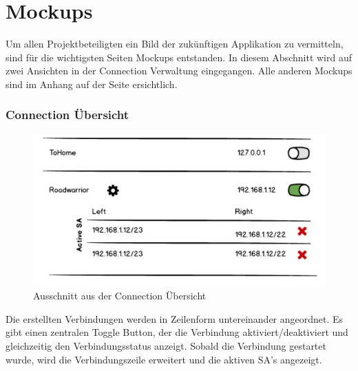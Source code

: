\section{Mockups}
Um allen Projektbeteiligten ein Bild der zukünftigen Applikation zu vermitteln, sind für die wichtigsten Seiten Mockups entstanden. In diesem Abschnitt wird auf zwei Ansichten in der Connection Verwaltung eingegangen. Alle anderen Mockups sind im Anhang auf der Seite \pageref{Mockups} ersichtlich.

\subsubsection{Connection Übersicht}
\begin{figure}[H]
	\centering
	\includegraphics[width=330pt]{images/mockups/short_con_overview.jpg}
	\caption{Ausschnitt aus der Connection Übersicht}
\end{figure}

Die erstellten Verbindungen werden in Zeilenform untereinander angeordnet. Es gibt einen zentralen Toggle Button, der die Verbindung aktiviert/deaktiviert und gleichzeitig den Verbindungsstatus anzeigt. Sobald die Verbindung gestartet wurde, wird die Verbindungszeile erweitert und die aktiven SA's angezeigt.

